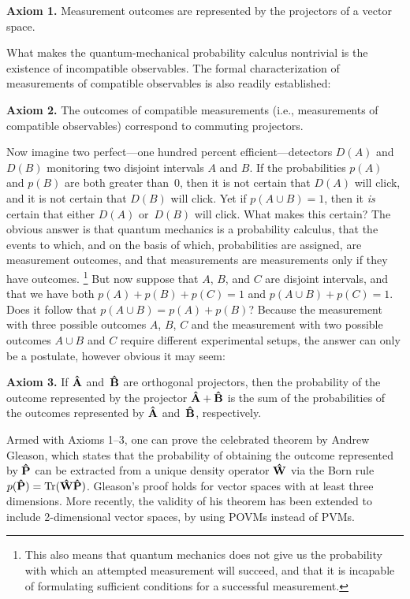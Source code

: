 \documentclass[smallextended]{svjour3}
\newcommand{\hA}{{\bf\hat A}}
\newcommand{\hB}{{\bf\hat B}}
\newcommand{\hP}{{\bf\hat P}}
\newcommand{\hW}{{\bf\hat W}}
\newcommand{\Tr}{\hbox{Tr}}
\begin{document}
\medskip\noindent\textbf{Axiom 1.} {Measurement outcomes are represented by the projectors of a vector space.}

\medskip\noindent What makes the quantum-mechanical probability calculus nontrivial is the existence of incompatible observables. The formal characterization of measurements of compatible observables is also readily established\cite{Mohrhoff-QMexplained}:

\medskip\noindent\textbf{Axiom 2.} {The outcomes of compatible measurements (i.e., measurements of compatible observables) correspond to commuting projectors.}

\medskip\noindent Now imagine two perfect---one hundred percent efficient---detectors $D(A)$ and $D(B)$ monitoring two disjoint intervals $A$ and $B$. If the probabilities $p({A})$ and $p({B})$ are both greater than~0, then it is not certain that $D(A)$ will click, and it is not certain that $D(B)$ will click. Yet if $p({A}\cup {B})=1$, then it \textit{is} certain that either $D(A)$ or~$D(B)$ will click. What makes this certain? The obvious answer is that quantum mechanics is a probability calculus, that the events to which, and on the basis of which, probabilities are assigned, are measurement outcomes, and that measurements are measurements only if they have outcomes.%
\footnote{This also means that quantum mechanics does not give us the probability with which an attempted measurement will succeed, and that it is incapable of formulating sufficient conditions for a successful measurement.}
But now suppose that $A$, $B$, and $C$ are disjoint intervals, and that we have both $p({A})+p({B})+p({C})=1$ and $p({A}\cup{B})+p({C})=1$.  Does it follow that  $p(A\cup B)=p(A)+p(B)$? Because the measurement with three possible outcomes $A$, $B$, $C$ and the measurement with two possible outcomes ${A}\cup{B}$ and ${C}$ require different experimental setups, the answer can only be a postulate, however obvious it may seem:

\medskip\noindent\textbf{Axiom 3.} If $\hA$ and~$\hB$ are orthogonal projectors, then the probability of the outcome represented by the projector $\hA+\hB$ is the sum of the probabilities of the outcomes represented by $\hA$ and~$\hB$, respectively.

\medskip\noindent Armed with Axioms 1--3, one can prove the celebrated theorem by Andrew Gleason,\cite{Gleason} which states that the probability of obtaining the outcome represented by $\hP$ can be extracted from a unique density operator $\hW$ via the Born rule $p(\hP)=\Tr(\hW\hP)$. Gleason's proof holds for vector spaces with at least three dimensions. More recently, the validity of his theorem has been extended to include 2-dimensional vector spaces, by using POVMs instead of PVMs.\cite{Fuchs2001,Busch,Cavesetal}
\end{document}
